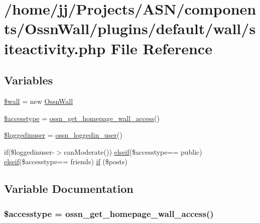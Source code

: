 \hypertarget{siteactivity_8php}{}\section{/home/jj/\+Projects/\+A\+S\+N/components/\+Ossn\+Wall/plugins/default/wall/siteactivity.php File Reference}
\label{siteactivity_8php}
\subsection*{Variables}
\begin{DoxyCompactItemize}
\item 
\hyperlink{siteactivity_8php_a79db619dde07aaf30162c97aeb68cdff}{\$wall} = new \hyperlink{class_ossn_wall}{Ossn\+Wall}
\item 
\hyperlink{siteactivity_8php_a6a73720ac53a7b25bfb62bdd0bcdc431}{\$accesstype} = \hyperlink{_ossn_wall_2ossn__com_8php_ae2b187d64c1ad13774a11c36d0fd9c84}{ossn\+\_\+get\+\_\+homepage\+\_\+wall\+\_\+access}()
\item 
\hyperlink{siteactivity_8php_a4c0724683a2226d71f87cc5908fe1dfe}{\$loggedinuser} = \hyperlink{ossn_8lib_8users_8php_aa3c8068d0e6638b414d6a2f6c62565b8}{ossn\+\_\+loggedin\+\_\+user}()
\item 
if(\$loggedinuser-\/$>$can\+Moderate()) \hyperlink{cache__settings_8php_aac633c7b6b07fcf67f4504fb5c57a856}{elseif}(\$accesstype== \textquotesingle{}public\textquotesingle{}) \hyperlink{cache__settings_8php_aac633c7b6b07fcf67f4504fb5c57a856}{elseif}(\$accesstype== \textquotesingle{}friends\textquotesingle{}) \hyperlink{siteactivity_8php_a902b6a5cdec3d39dbcef4cf35d4a2a30}{if} (\$posts)
\end{DoxyCompactItemize}


\subsection{Variable Documentation}
\subsubsection[{\texorpdfstring{\$accesstype}{$accesstype}}]{\setlength{\rightskip}{0pt plus 5cm}\$accesstype = {\bf ossn\+\_\+get\+\_\+homepage\+\_\+wall\+\_\+access}()}\hypertarget{siteactivity_8php_a6a73720ac53a7b25bfb62bdd0bcdc431}{}\label{siteactivity_8php_a6a73720ac53a7b25bfb62bdd0bcdc431}


